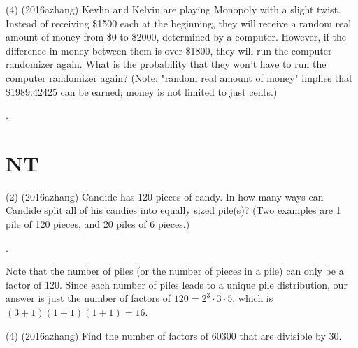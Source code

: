 \documentclass[11pt]{article}
\begin{document}
\begin{problem}

(4) (2016azhang) Kevlin and Kelvin are playing Monopoly with a slight twist. Instead of receiving \$1500 each at the beginning, they will receive a random real amount of money from \$0 to \$2000, determined by a computer. However, if the difference in money between them is over \$1800, they will run the computer randomizer again. What is the probability that they won't have to run the computer randomizer again? (Note: "random real amount of money" implies that \$1989.42425 can be earned; money is not limited to just cents.)
\end{problem}

\begin{answer}
.
\end{answer}

\begin{solution}
\end{solution}

\section{NT}
\begin{problem}
(2) (2016azhang) Candide has 120 pieces of candy. In how many ways can Candide split all of his candies into equally sized pile(s)? (Two examples are 1 pile of 120 pieces, and 20 piles of 6 pieces.)
\end{problem}

\begin{answer}
.
\end{answer}

\begin{solution}
Note that the number of piles (or the number of pieces in a pile) can only be a factor of 120. Since each number of piles leads to a unique pile distribution, our answer is just the number of factors of $120 = 2^{3}\cdot3\cdot5$, which is $(3+1)(1+1)(1+1) = 16$.
\end{solution}

\begin{problem}
(4) (2016azhang) Find the number of factors of 60300 that are divisible by 30.
\end{problem}
\end{document}

